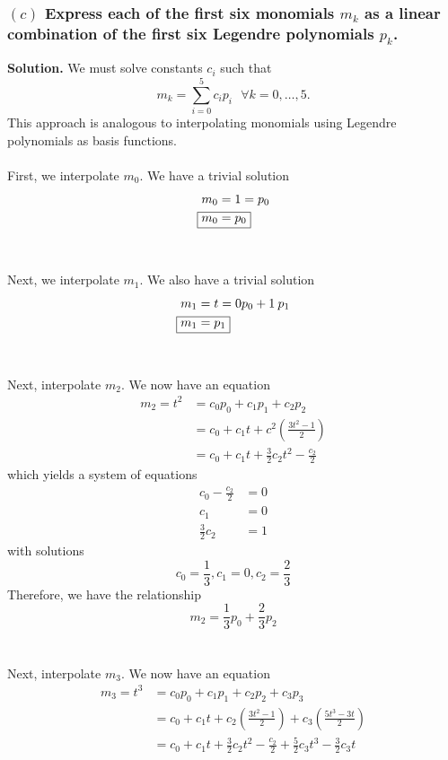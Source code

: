 \subsubsection*{$(c)$ Express each of the first six monomials ${m_k}$ as a linear combination of the first six Legendre polynomials ${p_k}$.}
\textbf{Solution.} We must solve constants $c_i$ such that
\begin{equation}\label{defm}
m_k = \sum_{i=0}^{5}c_ip_i\:\:\:\forall k=0,\ldots,5.
\end{equation}
This approach is analogous to interpolating monomials using Legendre polynomials as basis functions.
\\
\\
First, we interpolate $m_0$. We have a trivial solution
\begin{align*}
m_0 &= 1 = p_0\\
\Aboxed{m_0 &= p_0}
\end{align*}
\\
\\
Next, we interpolate $m_1$. We also have a trivial solution
\begin{align*}
m_1 &= t = 0p_0+1\:p_1\\
\Aboxed{m_1 &= p_1}
\end{align*}
\\
\\
Next, interpolate $m_2$. We now have an equation
\begin{align*}
m_2 = t^2 &= c_0p_0 + c_1p_1 + c_2p_2\\
&= c_0 + c_1t + c^2 \left(\frac{3t^2-1}{2}\right)\\
&= c_0 + c_1t + \frac{3}{2}c_2t^2 - \frac{c_2}{2}
\end{align*}
which yields a system of equations
\begin{align*}
c_0-\frac{c_2}{2} &= 0\\
c_1 &= 0\\
\frac{3}{2}c_2 &= 1
\end{align*}
with solutions
\begin{equation*}
c_0 = \frac{1}{3}, c_1 = 0, c_2 = \frac{2}{3}
\end{equation*}
Therefore, we have the relationship
\begin{equation*}
\boxed{m_2 = \frac{1}{3}p_0 + \frac{2}{3}p_2}
\end{equation*}
\\
\\
Next, interpolate $m_3$. We now have an equation
\begin{align*}
m_3 = t^3 &= c_0p_0 + c_1p_1 + c_2p_2 + c_3p_3\\
&= c_0 + c_1t + c_2 \left(\frac{3t^2-1}{2}\right) + c_3 \left(\frac{5t^3-3t}{2}\right)\\
&= c_0 + c_1t + \frac{3}{2}c_2t^2 - \frac{c_2}{2} + \frac{5}{2}c_3t^3 - \frac{3}{2}c_3t
\end{align*}
